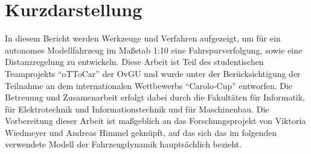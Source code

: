 \maketitle 
\setcounter{tocdepth}{2}

\section*{Kurzdarstellung}
In diesem Bericht werden Werkzeuge und Verfahren aufgezeigt, um für ein autonomes Modellfahrzeug im Maßstab 1:10 eine Fahrspurverfolgung, sowie eine Distanzregelung zu entwickeln. Diese Arbeit ist Teil des studentischen Teamprojekts "`oTToCar"' der OvGU und wurde unter der Berücksichtigung der Teilnahme an dem internationalen Wettbewerbs "`Carolo-Cup"' \cite{RegelW} entworfen. Die Betreuung und Zusamenarbeit erfolgt dabei durch die Fakultäten für Informatik, für Elektrotechnik und Informationstechnik und für Maschinenbau. Die Vorbereitung dieser Arbeit ist maßgeblich an das Forschungsprojekt \cite{VikAnd} von Viktoria Wiedmeyer und Andreas Himmel geknüpft, auf das sich das im folgenden verwendete Modell der Fahrzeugdynamik hauptsächlich bezieht. 